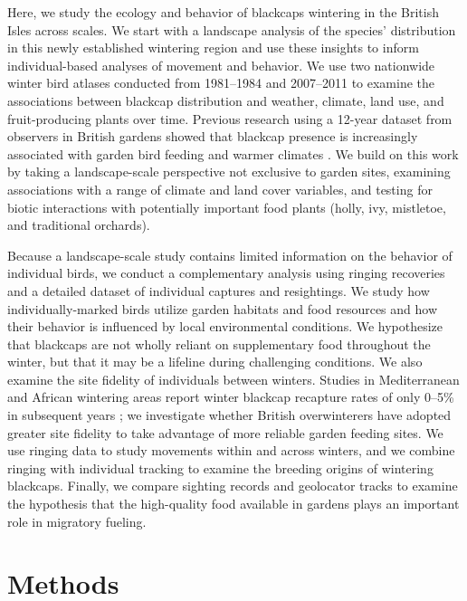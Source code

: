 \documentclass[a4paper, nobind]{templates/ociamthesis}
\begin{document}
Here, we study the ecology and behavior of blackcaps wintering in the British Isles across scales. We start with a landscape analysis of the species' distribution in this newly established wintering region and use these insights to inform individual-based analyses of movement and behavior. We use two nationwide winter bird atlases conducted from 1981--1984 \autocite{blandBlackcap1986} and 2007--2011 \autocite{balmer2013bird} to examine the associations between blackcap distribution and weather, climate, land use, and fruit-producing plants over time. Previous research using a 12-year dataset from observers in British gardens showed that blackcap presence is increasingly associated with garden bird feeding and warmer climates \autocite{plummerSupplementaryFeedingGardens2015}. We build on this work by taking a landscape-scale perspective not exclusive to garden sites, examining associations with a range of climate and land cover variables, and testing for biotic interactions with potentially important food plants (holly, ivy, mistletoe, and traditional orchards).

Because a landscape-scale study contains limited information on the behavior of individual birds, we conduct a complementary analysis using ringing recoveries and a detailed dataset of individual captures and resightings. We study how individually-marked birds utilize garden habitats and food resources and how their behavior is influenced by local environmental conditions. We hypothesize that blackcaps are not wholly reliant on supplementary food throughout the winter, but that it may be a lifeline during challenging conditions. We also examine the site fidelity of individuals between winters. Studies in Mediterranean and African wintering areas report winter blackcap recapture rates of only 0--5\% in subsequent years \autocite{cuadradoAllBlackcapsSylvia1995,cuadradoYearYearRecurrence1992,kingSiteFidelityRecurrence2001,loveiMigrationWinteringBlackcap1985}; we investigate whether British overwinterers have adopted greater site fidelity to take advantage of more reliable garden feeding sites. We use ringing data to study movements within and across winters, and we combine ringing with individual tracking to examine the breeding origins of wintering blackcaps. Finally, we compare sighting records and geolocator tracks to examine the hypothesis that the high-quality food available in gardens plays an important role in migratory fueling.

\hypertarget{methods-1}{%
\section{Methods}\label{methods-1}}
\end{document}
